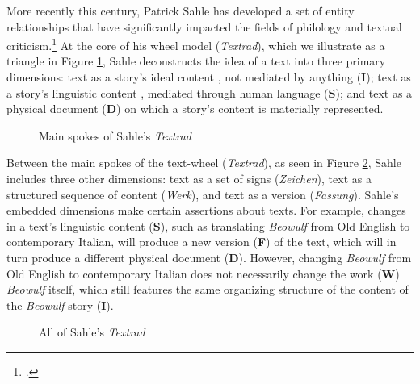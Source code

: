 More recently this century, Patrick Sahle has developed a set of entity relationships that have significantly impacted the fields of philology and textual criticism.\footcite{Sahle2013} At the core of his wheel model (\textit{Textrad}), which we illustrate as a triangle in Figure \ref{fig:Textrad}, Sahle deconstructs the idea of a text into three primary dimensions: text as a story's ideal content , not mediated by anything (\textbf{I}); text as a story's linguistic content , mediated through human language (\textbf{S}); and text as a physical document  (\textbf{D}) on which a story's content is materially represented.

\begin{figure}[ht]

\caption{Main spokes of Sahle's \textit{Textrad}}
\label{fig:Textrad}
\end{figure}

Between the main spokes of the text-wheel (\textit{Textrad}), as seen in Figure \ref{fig:TextradAll}, Sahle includes three other dimensions: text as a set of signs (\textit{Zeichen}), text as a structured sequence of content (\textit{Werk}), and text as a version (\textit{Fassung}). Sahle's embedded dimensions make certain assertions about texts. For example, changes in a text's linguistic content (\textbf{S}), such as translating \textit{Beowulf} from Old English to contemporary Italian, will produce a new version (\textbf{F}) of the text, which will in turn produce a different physical document (\textbf{D}). However, changing \textit{Beowulf} from Old English to contemporary Italian does not necessarily change the work (\textbf{W}) \textit{Beowulf} itself, which still features the same organizing structure of the content of the \textit{Beowulf} story (\textbf{I}).

\begin{figure}[ht]

\caption{All of Sahle's \textit{Textrad}}
\label{fig:TextradAll}
\end{figure}

